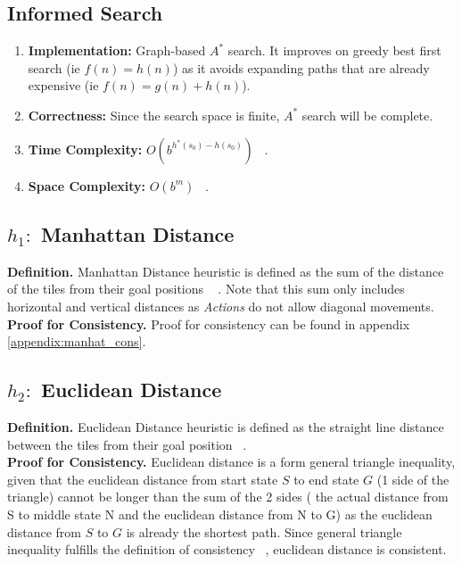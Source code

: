 \documentclass[runningheads]{llncs}
\begin{document}
\subsection{Informed Search}
\begin{enumerate}
    \item \textbf{Implementation:} Graph-based \( A^* \) search. It improves on greedy best first search (ie \( f(n) = h(n) \)) as it avoids expanding paths that are already expensive (ie \( f(n) = g(n) + h(n) \)).
    \item \textbf{Correctness:} Since the search space is finite, \( A^* \) search will be complete.
    \item \textbf{Time Complexity:} \( O(b^{h^*(s_0) - h(s_0)}) \) ~\cite[p93-99]{stuart_russell_artifical_2010}.
    \item \textbf{Space Complexity:} \( O(b^m) \) ~\cite[p93-99]{stuart_russell_artifical_2010}.
\end{enumerate}

\subsection{\(h_1:\) Manhattan Distance} 
\textbf{Definition.} Manhattan Distance heuristic is defined as the sum of the distance of the tiles from their goal positions ~\cite[p103]{stuart_russell_artifical_2010} . Note that this sum only includes horizontal and vertical distances as \textit{Actions} do not allow diagonal movements. \\
\textbf{Proof for Consistency.} Proof for consistency can be found in appendix \ref{appendix:manhat_cons}.

\subsection{\(h_2:\) Euclidean Distance}
\textbf{Definition.} Euclidean Distance heuristic is defined as the straight line distance between the tiles from their goal position ~\cite{rosalind_euclidean_nodate}. \\
\textbf{Proof for Consistency.} Euclidean distance is a form general triangle inequality, given that the euclidean distance from start state \( S \) to end state \( G \) (1 side of the triangle) cannot be longer than the sum of the 2 sides ( the actual distance from S to middle state N and the euclidean distance from N to G) as the euclidean distance from \( S \) to \( G \) is already the shortest path. 
Since general triangle inequality fulfills the definition of consistency ~\cite[p95]{stuart_russell_artifical_2010}, euclidean distance is consistent.
\end{document}
